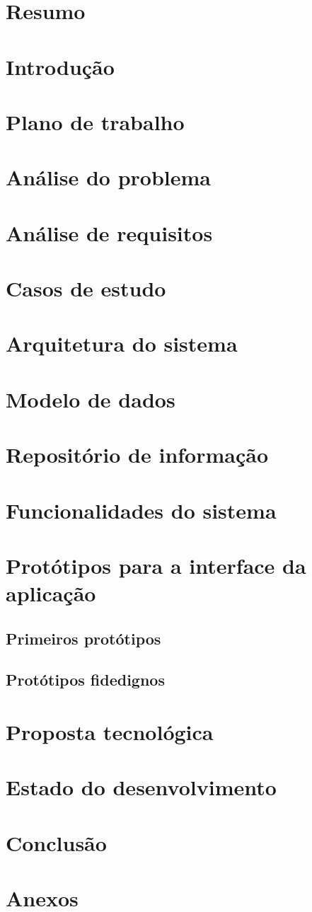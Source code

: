 \documentclass{article}
\begin{document}
 

\section{Resumo}
\newpage

\tableofcontents
\newpage

\section{Introdução}
\section{Plano de trabalho}
\section{Análise do problema}
\section{Análise de requisitos}
\section{Casos de estudo}
\section{Arquitetura do sistema}
\section{Modelo de dados}
\section{Repositório de informação}
\section{Funcionalidades do sistema}
\section{Protótipos para a interface da aplicação}
\subsection{Primeiros protótipos}
\subsection{Protótipos fidedignos}
\section{Proposta tecnológica}
\section{Estado do desenvolvimento}
\section{Conclusão}
\section{Anexos}
\end{document}
